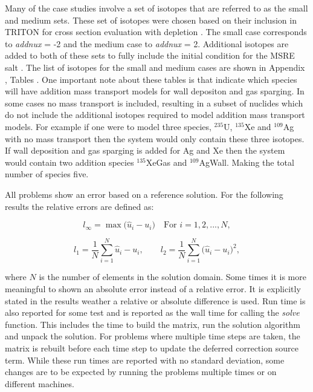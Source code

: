 Many of the case studies involve a set of isotopes that are referred to as the small and medium sets. These set of isotopes were chosen based on their inclusion in TRITON for cross section evaluation with depletion \cite{scaleManual}. The small case corresponds to \textit{addnux} = -2 and the medium case to \textit{addnux} = 2. Additional isotopes are added to both of these sets to fully include the initial condition for the MSRE salt \cite{MSREbenchmark}. The list of isotopes for the small and medium cases are shown in Appendix , Tables  . One important note about these tables is that indicate which species will have addition mass transport models for wall depositon and gas sparging. In some cases no mass transport is included, resulting in a subset of nuclides which do not include the additional isotopes required to model addition mass transport models. For example if one were to model three species, ${}^{235}$U, ${}^{135}$Xe and ${}^{109}$Ag with no mass transport then the system would only contain these three isotopes. If wall deposition and gas sparging is added for Ag and Xe then the system would contain two addition species ${}^{135}$XeGas and ${}^{109}$AgWall. Making the total number of species five. 

All problems show an error based on a reference solution. For the following results the relative errors are defined as:

\begin{equation*}
    l_{\infty} = \max\bigg(\hat{u}_{i} - u_{i}\bigg) \quad \text{For } i = 1, 2, ..., N,
\end{equation*}

\begin{equation*}
    l_{1} = \frac{1}{N}\sum_{i=1}^{N}\hat{u}_{i} - u_{i}, \quad \quad l_{2} = \frac{1}{N}\sum_{i=1}^{N}\bigg(\hat{u}_{i} - u_{i}\bigg)^{2},
\end{equation*}

\noindent where $N$ is the number of elements in the solution domain. Some times it is more meaningful to shown an absolute error instead of a relative error. It is explicitly stated in the results weather a relative or absolute difference is used. Run time is also reported for some test and is reported as the wall time for calling the \textit{solve} function. This includes the time to build the matrix, run the solution algorithm and unpack the solution. For problems where multiple time steps are taken, the matrix is rebuilt before each time step to update the deferred correction source term. While these run times are reported with no standard deviation, some changes are to be expected by running the problems multiple times or on different machines. 

